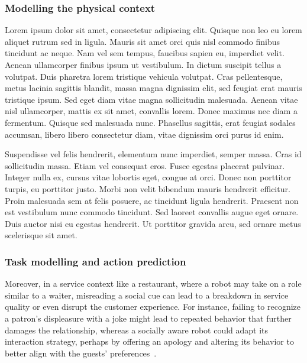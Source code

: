 \subsubsection{Modelling the physical context}

\begin{rewrite}
Lorem ipsum dolor sit amet, consectetur adipiscing elit. Quisque non leo eu
lorem aliquet rutrum sed in ligula. Mauris sit amet orci quis nisl commodo
finibus tincidunt ac neque. Nam vel sem tempus, faucibus sapien eu,
imperdiet velit. Aenean ullamcorper finibus ipsum ut vestibulum. In dictum
suscipit tellus a volutpat. Duis pharetra lorem tristique vehicula volutpat.
Cras pellentesque, metus lacinia sagittis blandit, massa magna dignissim
elit, sed feugiat erat mauris tristique ipsum. Sed eget diam vitae magna
sollicitudin malesuada. Aenean vitae nisl ullamcorper, mattis ex sit amet,
convallis lorem. Donec maximus nec diam a fermentum. Quisque sed malesuada
nunc. Phasellus sagittis, erat feugiat sodales accumsan, libero libero
consectetur diam, vitae dignissim orci purus id enim.

Suspendisse vel felis hendrerit, elementum nunc imperdiet, semper massa. Cras id
sollicitudin massa. Etiam vel consequat eros. Fusce egestas placerat
pulvinar. Integer nulla ex, cursus vitae lobortis eget, congue at orci.
Donec non porttitor turpis, eu porttitor justo. Morbi non velit bibendum
mauris hendrerit efficitur. Proin malesuada sem at felis posuere, ac
tincidunt ligula hendrerit. Praesent non est vestibulum nunc commodo
tincidunt. Sed laoreet convallis augue eget ornare. Duis auctor nisi eu
egestas hendrerit. Ut porttitor gravida arcu, sed ornare metus scelerisque
sit amet. 
\end{rewrite}


\subsubsection{Task modelling and action prediction}



Moreover, in a service context like a restaurant, where a robot may take on a
role similar to a waiter, misreading a social cue can lead to a breakdown in
service quality or even disrupt the customer experience. For instance, failing
to recognize a patron's displeasure with a joke might lead to repeated behavior
that further damages the relationship, whereas a socially aware robot could
adapt its interaction strategy, perhaps by offering an apology and altering its
behavior to better align with the guests' preferences~\cite{mutlu2006storytelling}.

